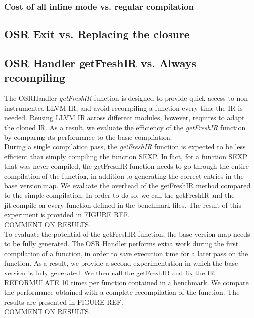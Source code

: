 \subsubsection{Cost of all inline mode vs. regular compilation}
\subsection{OSR Exit vs. Replacing the closure}

\subsection{OSR Handler getFreshIR vs. Always recompiling}

The OSRHandler \textit{getFreshIR} function is designed to provide quick access to non-instrumented LLVM IR, and avoid recompiling a function every time the IR is needed.
Reusing LLVM IR across different modules, however, requires to adapt the cloned IR.
As a result, we evaluate the efficiency of the \textit{getFreshIR} function by comparing its performance to the basic compilation.\\

During a single compilation pass, the \textit{getFreshIR} function is expected to be less efficient than simply compiling the function SEXP.
In fact, for a function SEXP that was never compiled, the getFreshIR function needs to go through the entire compilation of the function, in addition to generating the correct entries in the base version map.
We evaluate the overhead of the getFreshIR method compared to the simple compilation.
In order to do so, we call the getFreshIR and the jit.compile on every function defined in the benchmark files.
The result of this experiment is provided in FIGURE REF.\\

COMMENT ON RESULTS.\\


To evaluate the potential of the getFreshIR function, the base version map needs to be fully generated.
The OSR Handler performs extra work during the first compilation of a function, in order to save execution time for a later pass on the function. 
As a result, we provide a second experimentation in which the base version is fully generated.
We then call the getFreshIR and fix the IR REFORMULATE 10 times per function contained in a benchmark. 
We compare the performance obtained with a complete recompilation of the function.
The results are presented in FIGURE REF.\\


COMMENT ON RESULTS.\\


